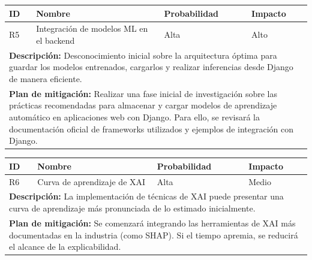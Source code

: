 \begin{center}
\small
\begin{tabular}{|p{}|p{}|p{}|p{}|}
\hline
\textbf{ID} & \textbf{Nombre} & \textbf{Probabilidad} & \textbf{Impacto} \\
\hline
R5 & Integración de modelos ML en el backend & Alta & Alto \\
\hline
\multicolumn{4}{|p{0.9\textwidth}|}{\textbf{Descripción:} Desconocimiento inicial sobre la arquitectura óptima para guardar los modelos entrenados, cargarlos y realizar inferencias desde Django de manera eficiente.} \\
\hline
\multicolumn{4}{|p{0.9\textwidth}|}{\textbf{Plan de mitigación:} Realizar una fase inicial de investigación sobre las prácticas recomendadas para almacenar y cargar modelos de aprendizaje automático en aplicaciones web con Django. Para ello, se revisará la documentación oficial de frameworks utilizados y ejemplos de integración con Django.} \\
\hline
\end{tabular}
\end{center}

\vspace{0.3cm}

\begin{center}
\small
\begin{tabular}{|p{}|p{}|p{}|p{}|}
\hline
\textbf{ID} & \textbf{Nombre} & \textbf{Probabilidad} & \textbf{Impacto} \\
\hline
R6 & Curva de aprendizaje de XAI & Alta & Medio \\
\hline
\multicolumn{4}{|p{0.9\textwidth}|}{\textbf{Descripción:} La implementación de técnicas de XAI puede presentar una curva de aprendizaje más pronunciada de lo estimado inicialmente.} \\
\hline
\multicolumn{4}{|p{0.9\textwidth}|}{\textbf{Plan de mitigación:} Se comenzará integrando las herramientas de XAI más documentadas en la industria (como SHAP). Si el tiempo apremia, se reducirá el alcance de la explicabilidad.} \\
\hline
\end{tabular}
\end{center}

\vspace{0.3cm}

